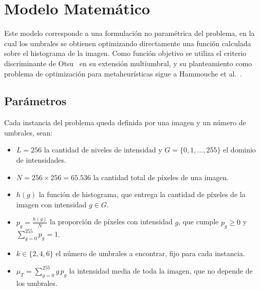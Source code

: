 \documentclass[letter, 10pt]{article}
\begin{document}
\section{Modelo Matem\'atico}
Este modelo corresponde a una formulaci\'on no param\'etrica del problema, en la cual los umbrales se obtienen optimizando directamente una funci\'on calculada sobre el histograma de la imagen.
Como funci\'on objetivo se utiliza el criterio discriminante de Otsu~\cite{Otsu1979} en su extensi\'on multiumbral,
y su planteamiento como problema de optimizaci\'on para metaheur\'isticas sigue a Hammouche et al.~\cite{Hammouche2010Comparative}.

\subsection{Par\'ametros}
Cada instancia del problema queda definida por una imagen y un n\'umero de umbrales, sean:
\begin{itemize}
    \item $L = 256$ la cantidad de niveles de intensidad y $G = \{0, 1, \dots, 255\}$ el dominio de intensidades.
    \item $N = 256 \times 256 = 65.536$ la cantidad total de p\'ixeles de una imagen.
    \item $h(g)$ la funci\'on de histograma, que entrega la cantidad de p\'ixeles de la imagen con intensidad $g \in G$.
    \item $p_g = \frac{h(g)}{N}$ la proporci\'on de p\'ixeles con intensidad $g$, que cumple $p_g \geq 0$ y $\sum\limits_{g=0}^{255} p_g = 1$.
    \item $k \in \{2, 4, 6\}$ el n\'umero de umbrales a encontrar, fijo para cada instancia.
    \item $\mu_T = \sum\limits_{g=0}^{255} g\, p_g$ la intensidad media de toda la imagen, que no depende de los umbrales.
\end{itemize}
\end{document}
